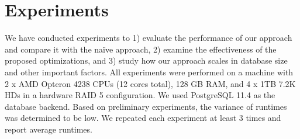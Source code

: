 \section{Experiments}
\label{sec:experiments}


\newcommand{\mn}{\textit{N}\xspace}
\newcommand{\mr}{\textit{R}\xspace}
\newcommand{\mrd}{\textit{R+DS}\xspace}
\newcommand{\mrp}{\textit{R+PS}\xspace}
\newcommand{\mrdp}{\textit{R+PS+DS}\xspace}

We have conducted experiments to 1) evaluate the performance of our approach and compare it with the naïve approach, 2) examine the effectiveness of the proposed optimizations, and 3) study how our approach scales in database size and %
other important factors.
All experiments were performed on a machine with 2 x AMD Opteron 4238 CPUs (12 cores total), 128 GB RAM, and 4 x 1TB 7.2K
HDs in a hardware RAID 5 configuration. We used PostgreSQL 11.4 as the database backend.
Based on preliminary experiments, the variance of runtimes was determined to be low. We repeated each experiment at least 3 times and report average runtimes.

